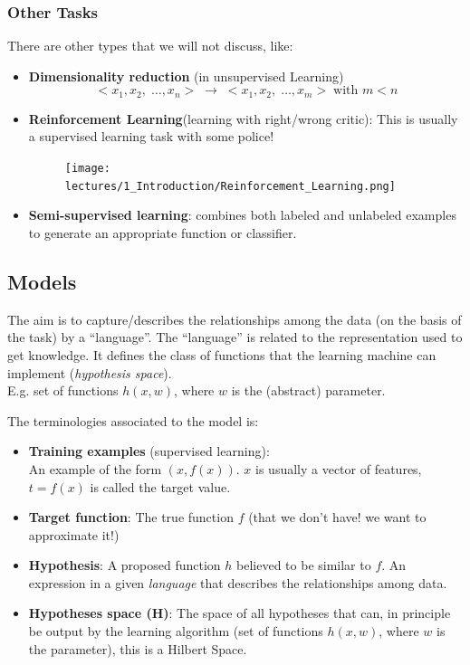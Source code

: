 \documentclass[../main.tex]{subfiles}
\begin{document}
\subsubsection{Other Tasks}
There are other types that we will not discuss, like:
\begin{itemize}
    \item \textbf{Dimensionality reduction} (in unsupervised Learning)
    $$ <x_1, x_2, \; \dots, x_n> \; \rightarrow \; <x_1, x_2, \; \dots, x_m> \; \text{with } m < n  $$
    
    \item \textbf{Reinforcement Learning}(learning with right/wrong critic):
    This is usually a supervised learning task with some police!
    \begin{figure}[H]
        \centering
        \texttt{[image: lectures/1\_Introduction/Reinforcement\_Learning.png]}
    \end{figure}

    \item \textbf{Semi-supervised learning}: combines both labeled and unlabeled examples to generate an appropriate function or classifier.
\end{itemize}

\subsection{Models}
The aim is to capture/describes the relationships among the data (on the basis of the task) by a “language”. The “language” is related to the representation used to get knowledge. It defines the class of functions that the learning machine can implement (\emph{hypothesis space}). \\
E.g. set of functions $h(x,w)$, where $w$ is the (abstract) parameter.

\begin{definition}
The terminologies associated to the model is:
\begin{itemize}
    \item \textbf{Training examples} (supervised learning):\\
    An example of the form $(x, f(x))$. $x$ is usually a vector of features, $t=f(x)$ is called the target value.
    \item \textbf{Target function}: The true function $f$ (that we don't have! we want to approximate it!)
    \item \textbf{Hypothesis}: A proposed function $h$ believed to be similar to $f$. An expression in a given \emph{language} that describes the relationships among data.
    \item \textbf{Hypotheses space (H)}: The space of all hypotheses that can, in principle be output by the learning algorithm (set of functions $h(x,w)$, where $w$ is the parameter), this is a Hilbert Space.
\end{itemize}   
\end{definition}
\end{document}
